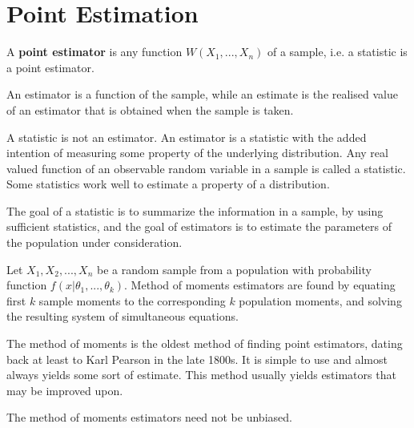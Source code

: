 \section*{Point Estimation}

\begin{defn}
A \textbf{point estimator} is any function $W(X_1, ..., X_n)$ of a sample, i.e. a statistic is a point estimator.
\end{defn}

\begin{note}
    An estimator is a function of the sample, while an estimate is the realised value of an estimator that is obtained when the sample is taken.
\end{note}

\begin{remark}
    A statistic is not an estimator. An estimator is a statistic with the added intention of measuring some property of the underlying distribution. 
    Any real valued function of an observable random variable in a sample is called a statistic. 
    Some statistics work well to estimate a property of a distribution.

    The goal of a statistic is to summarize the information in a sample, by using sufficient statistics, and the goal of estimators is to estimate the parameters of the population under consideration.
\end{remark}

\begin{result}
    Let $X_1, X_2, ..., X_n$ be a random sample from a population with probability function $f(x|\theta_1, ..., \theta_k)$.
    Method of moments estimators are found by equating first $k$ sample moments to the corresponding $k$ population moments, and solving the resulting system of simultaneous equations.


\end{result}

\begin{note}
    The method of moments is the oldest method of finding point estimators, dating back at least to Karl Pearson in the late 1800s. 
    It is simple to use and almost always yields some sort of estimate. This method usually yields estimators that may be improved upon.
\end{note}

\begin{note}
    The method of moments estimators need not be unbiased.
\end{note}

